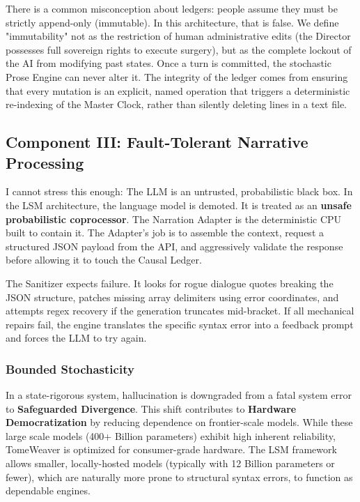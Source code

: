 \documentclass[12pt, a4paper]{article}
\begin{document}
There is a common misconception about ledgers: people assume they must be strictly append-only (immutable). In this architecture, that is false. We define "immutability" not as the restriction of human administrative edits (the Director possesses full sovereign rights to execute surgery), but as the complete lockout of the AI from modifying past states. Once a turn is committed, the stochastic Prose Engine can never alter it. The integrity of the ledger comes from ensuring that every mutation is an explicit, named operation that triggers a deterministic re-indexing of the Master Clock, rather than silently deleting lines in a text file.

\subsection{Component III: Fault-Tolerant Narrative Processing}
\label{subsec:prose}

I cannot stress this enough: The LLM is an untrusted, probabilistic black box. In the LSM architecture, the language model is demoted. It is treated as an \textbf{unsafe probabilistic coprocessor}. The Narration Adapter is the deterministic CPU built to contain it. The Adapter's job is to assemble the context, request a structured JSON payload from the API, and aggressively validate the response before allowing it to touch the Causal Ledger.

The Sanitizer expects failure. It looks for rogue dialogue quotes breaking the JSON structure, patches missing array delimiters using error coordinates, and attempts regex recovery if the generation truncates mid-bracket. If all mechanical repairs fail, the engine translates the specific syntax error into a feedback prompt and forces the LLM to try again.

\subsubsection{Bounded Stochasticity}
In a state-rigorous system, hallucination is downgraded from a fatal system error to \textbf{Safeguarded Divergence}. This shift contributes to \textbf{Hardware Democratization} by reducing dependence on frontier-scale models. While these large scale models (400+ Billion parameters) exhibit high inherent reliability, TomeWeaver is optimized for consumer-grade hardware. The LSM framework allows smaller, locally-hosted models (typically with 12 Billion parameters or fewer), which are naturally more prone to structural syntax errors, to function as dependable engines. 
\end{document}
